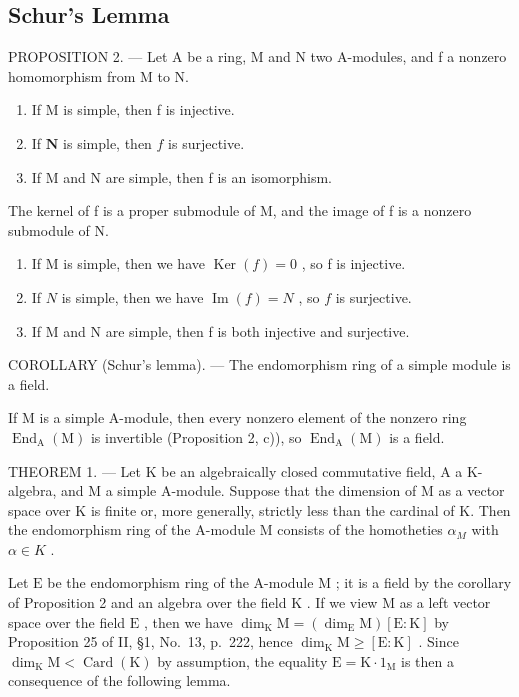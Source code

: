 \subsection{Schur's Lemma}

PROPOSITION 2. --- Let A be a ring, M and N two A-modules, and f a nonzero homomorphism from M to N.

\begin{enumerate}
\def\labelenumi{\alph{enumi})}
\item
  If M is simple, then f is injective.
\item
  If \(\mathbf{N}\) is simple, then \(f\) is surjective.
\item
  If M and N are simple, then f is an isomorphism.
\end{enumerate}

The kernel of f is a proper submodule of M, and the image of f is a nonzero submodule of N.

\begin{enumerate}
\def\labelenumi{\alph{enumi})}
\item
  If M is simple, then we have \(\operatorname{Ker}(f)=0\) , so f is injective.
\item
  If \(N\) is simple, then we have \(\operatorname{Im}(f) = N\) , so \(f\) is surjective.
\item
  If M and N are simple, then f is both injective and surjective.
\end{enumerate}

COROLLARY (Schur's lemma). --- The endomorphism ring of a simple module is a field.

If M is a simple A-module, then every nonzero element of the nonzero ring \(\operatorname{End}_{\mathrm{A}}(\mathrm{M})\) is invertible (Proposition 2, c)), so \(\operatorname{End}_{\mathrm{A}}(\mathrm{M})\) is a field.

THEOREM 1. --- Let K be an algebraically closed commutative field, A a K-algebra, and M a simple A-module. Suppose that the dimension of M as a vector space over K is finite or, more generally, strictly less than the cardinal of K. Then the endomorphism ring of the A-module M consists of the homotheties \(\alpha_{M}\) with \(\alpha \in K\) .

Let \(\mathrm{E}\) be the endomorphism ring of the A-module \(\mathrm{M}\) ; it is a field by the corollary of Proposition 2 and an algebra over the field \(\mathrm{K}\) . If we view \(\mathrm{M}\) as a left vector space over the field \(\mathrm{E}\) , then we have \(\dim_{\mathrm{K}} \mathrm{M} = (\dim_{\mathrm{E}} \mathrm{M})[\mathrm{E} : \mathrm{K}]\) by Proposition 25 of II, §1, No.~13, p.~222, hence \(\dim_{\mathrm{K}} \mathrm{M} \geqslant [\mathrm{E} : \mathrm{K}]\) . Since \(\dim_{\mathrm{K}} \mathrm{M} < \operatorname{Card}(\mathrm{K})\) by assumption, the equality \(\mathrm{E} = \mathrm{K} \cdot 1_{\mathrm{M}}\) is then a consequence of the following lemma.

